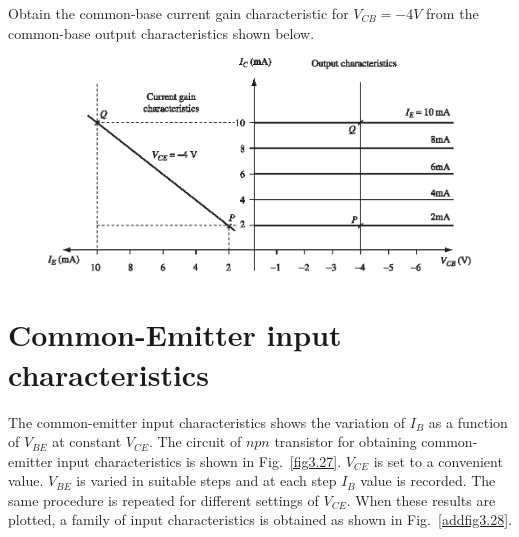\begin{example}\label{exam3.14}
Obtain the common-base current gain characteristic for $V_{CB}=-4V$ from the common-base output characteristics shown below.
\begin{figure}[H]
\centering
\includegraphics[scale=1.1]{chap2/S3-EE-03-025.eps}
\end{figure}
\end{example}


\section{Common-Emitter input characteristics}\label{sec3.20}

The common-emitter input characteristics shows the variation of $I_{B}$ as a function of $V_{BE}$ at constant $V_{CE}$. The circuit of $npn$ transistor for obtaining common-emitter input characteristics is shown in Fig.~\ref{fig3.27}. $V_{CE}$ is set to a convenient value. $V_{BE}$ is varied in suitable steps and at each step $I_{B}$ value is recorded. The same procedure is repeated for different settings of $V_{CE}$. When these results are plotted, a family of input characteristics is obtained as shown in Fig.~\ref{addfig3.28}.

